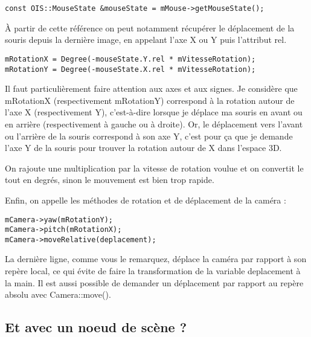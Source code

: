 \begin{lstlisting}[caption={}]
const OIS::MouseState &mouseState = mMouse->getMouseState();
\end{lstlisting}

\`A partir de cette r\'ef\'erence on peut notamment r\'ecup\'erer le d\'eplacement de la souris depuis la derni\`ere image, en appelant l'axe X ou Y puis l'attribut rel.


\begin{lstlisting}[caption={}]
mRotationX = Degree(-mouseState.Y.rel * mVitesseRotation);
mRotationY = Degree(-mouseState.X.rel * mVitesseRotation);
\end{lstlisting}

Il faut particuli\`erement faire attention aux axes et aux signes. Je consid\`ere que mRotationX (respectivement mRotationY) correspond \`a la rotation autour de l'axe X (respectivement Y), c'est-\`a-dire lorsque je d\'eplace ma souris en avant ou en arri\`ere (respectivement \`a gauche ou \`a droite). Or, le d\'eplacement vers l'avant ou l'arri\`ere de la souris correspond \`a son axe Y, c'est pour \c{c}a que je demande l'axe Y de la souris pour trouver la rotation autour de X dans l'espace 3D.

On rajoute une multiplication par la vitesse de rotation voulue et on convertit le tout en degr\'es, sinon le mouvement est bien trop rapide.

Enfin, on appelle les m\'ethodes de rotation et de d\'eplacement de la cam\'era :

\begin{lstlisting}[caption={}]
mCamera->yaw(mRotationY);
mCamera->pitch(mRotationX);
mCamera->moveRelative(deplacement);
\end{lstlisting}

La derni\`ere ligne, comme vous le remarquez, d\'eplace la cam\'era par rapport \`a son rep\`ere local, ce qui \'evite de faire la transformation de la variable deplacement \`a la main. Il est aussi possible de demander un d\'eplacement par rapport au rep\`ere absolu avec Camera::move().


















\subsection{Et avec un noeud de sc\`ene ?}

